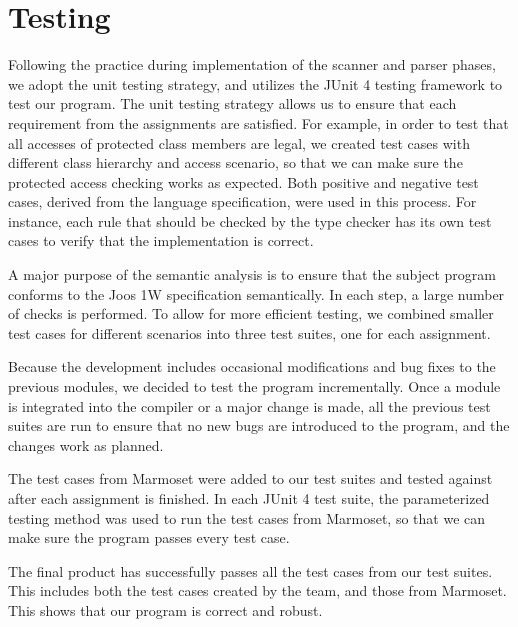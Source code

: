 \documentclass[a4paper, notitlepage]{report}
\begin{document}
%

\chapter{Testing}
\label{testing}
Following the practice during implementation of the scanner and parser phases, we adopt the unit testing strategy, and utilizes the JUnit 4 testing framework to test our program. The unit testing strategy allows us to ensure that each requirement from the assignments are satisfied. For example, in order to test that all accesses of protected class members are legal, we created test cases with different class hierarchy and access scenario, so that we can make sure the protected access checking works as expected. Both positive and negative test cases, derived from the language specification, were used in this process. For instance, each rule that should be checked by the type checker has its own test cases to verify that the implementation is correct.

A major purpose of the semantic analysis is to ensure that the subject program conforms to the Joos 1W specification semantically. In each step, a large number of checks is performed. To allow for more efficient testing, we combined smaller test cases for different scenarios into three test suites, one for each assignment.

Because the development includes occasional modifications and bug fixes to the previous modules, we decided to test the program incrementally. Once a module is integrated into the compiler or a major change is made, all the previous test suites are run to ensure that no new bugs are introduced to the program, and the changes work as planned.

The test cases from Marmoset were added to our test suites and tested against after each assignment is finished. In each JUnit 4 test suite, the parameterized testing method was used to run the test cases from Marmoset, so that we can make sure the program passes every test case. 

The final product has successfully passes all the test cases from our test suites. This includes both the test cases created by the team, and those from Marmoset. This shows that our program is correct and robust.
\end{document}
